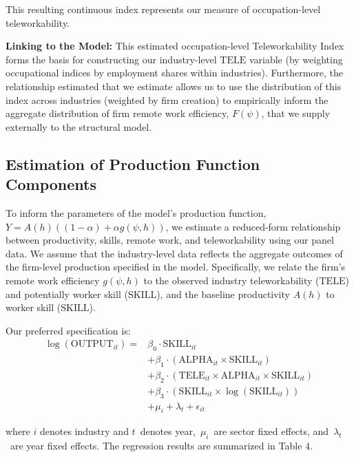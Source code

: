 \documentclass[
  11pt,
  letterpaper,
  DIV=11,
  numbers=noendperiod]{scrartcl}
\theoremstyle{plain}
\theoremstyle{remark}
\begin{document}
This resulting continuous index represents our measure of
occupation-level teleworkability.

\textbf{Linking to the Model:} This estimated occupation-level
Teleworkability Index forms the basis for constructing our
industry-level \(\text{TELE}\) variable (by weighting occupational
indices by employment shares within industries). Furthermore, the
relationship estimated that we estimate allows us to use the
distribution of this index across industries (weighted by firm creation)
to empirically inform the aggregate distribution of firm remote work
efficiency, \(F(\psi)\), that we supply externally to the structural
model.

\subsection{Estimation of Production Function
Components}\label{estimation-of-production-function-components}

To inform the parameters of the model's production function,
\(Y = A(h) ((1-\alpha) + \alpha g(\psi, h))\), we estimate a
reduced-form relationship between productivity, skills, remote work, and
teleworkability using our panel data. We assume that the industry-level
data reflects the aggregate outcomes of the firm-level production
specified in the model. Specifically, we relate the firm's remote work
efficiency \(g(\psi, h)\) to the observed industry teleworkability
(\(\text{TELE}\)) and potentially worker skill (\(\text{SKILL}\)), and
the baseline productivity \(A(h)\) to worker skill (\(\text{SKILL}\)).

Our preferred specification is:\\
\begin{equation}\label{eq:reducedFormProd}
\begin{aligned}
    \log(\text{OUTPUT}_{it}) ={}& \beta_0 \cdot \text{SKILL}_{it} \\
    & + \beta_1 \cdot (\text{ALPHA}_{it} \times \text{SKILL}_{it}) \\
    & + \beta_2 \cdot (\text{TELE}_{it} \times \text{ALPHA}_{it} \times \text{SKILL}_{it}) \\
    & + \beta_3 \cdot (\text{SKILL}_{it} \times \log(\text{SKILL}_{it})) \\
    & + \mu_i + \lambda_t + \epsilon_{it}
\end{aligned}
\end{equation}

where \(i\) denotes industry and \(t\)~denotes year,~\(\mu_{i}\)~are
sector fixed effects, and~\(\lambda_{t}\)~are year fixed effects. The
regression results are summarized in Table 4.
\end{document}
